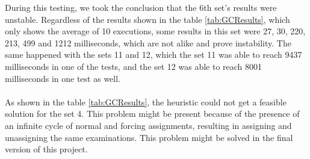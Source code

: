 During this testing, we took the conclusion that the 6th set's results were unstable. Regardless of the results shown in the table \ref{tab:GCResults}, which only shows the average of 10 executions, some results in this set were 27, 30, 220, 213, 499 and 1212 milliseconds, which are not alike and prove instability. The same happened with the sets 11 and 12, which the set 11 was able to reach 9437 milliseconds in one of the tests, and the set 12 was able to reach 8001 milliseconds in one test as well.\\
\\
As shown in the table \ref{tab:GCResults}, the heuristic could not get a feasible solution for the set 4. This problem might be present because of the presence of an infinite cycle of normal and forcing assignments, resulting in assigning and unassigning the same examinations. This problem might be solved in the final version of this project.